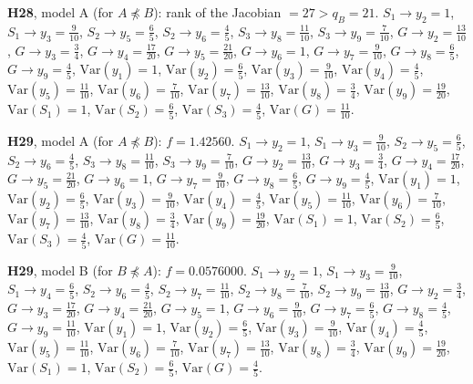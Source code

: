\documentclass[10pt,a4paper]{article}
\newcommand{\nnest}{\not\preceq}
\begin{document}
{\noindent\textbf{H28}, model A (for $A\nnest B$): rank of the Jacobian $=27>q_B=21$. {\footnotesize $S_{1}\to y_{2}=1$, $S_{1}\to y_{3}=\tfrac{9}{10}$, $S_{2}\to y_{5}=\tfrac{6}{5}$, $S_{2}\to y_{6}=\tfrac{4}{5}$, $S_{3}\to y_{8}=\tfrac{11}{10}$, $S_{3}\to y_{9}=\tfrac{7}{10}$, $G\to y_{2}=\tfrac{13}{10}$, $G\to y_{3}=\tfrac{3}{4}$, $G\to y_{4}=\tfrac{17}{20}$, $G\to y_{5}=\tfrac{21}{20}$, $G\to y_{6}=1$, $G\to y_{7}=\tfrac{9}{10}$, $G\to y_{8}=\tfrac{6}{5}$, $G\to y_{9}=\tfrac{4}{5}$, $\mathrm{Var}(y_{1})=1$, $\mathrm{Var}(y_{2})=\tfrac{6}{5}$, $\mathrm{Var}(y_{3})=\tfrac{9}{10}$, $\mathrm{Var}(y_{4})=\tfrac{4}{5}$, $\mathrm{Var}(y_{5})=\tfrac{11}{10}$, $\mathrm{Var}(y_{6})=\tfrac{7}{10}$, $\mathrm{Var}(y_{7})=\tfrac{13}{10}$, $\mathrm{Var}(y_{8})=\tfrac{3}{4}$, $\mathrm{Var}(y_{9})=\tfrac{19}{20}$, $\mathrm{Var}(S_{1})=1$, $\mathrm{Var}(S_{2})=\tfrac{6}{5}$, $\mathrm{Var}(S_{3})=\tfrac{4}{5}$, $\mathrm{Var}(G)=\tfrac{11}{10}$.}\par\smallskip
\noindent\textbf{H29}, model A (for $A\nnest B$): $f=1.42560$. {\footnotesize $S_{1}\to y_{2}=1$, $S_{1}\to y_{3}=\tfrac{9}{10}$, $S_{2}\to y_{5}=\tfrac{6}{5}$, $S_{2}\to y_{6}=\tfrac{4}{5}$, $S_{3}\to y_{8}=\tfrac{11}{10}$, $S_{3}\to y_{9}=\tfrac{7}{10}$, $G\to y_{2}=\tfrac{13}{10}$, $G\to y_{3}=\tfrac{3}{4}$, $G\to y_{4}=\tfrac{17}{20}$, $G\to y_{5}=\tfrac{21}{20}$, $G\to y_{6}=1$, $G\to y_{7}=\tfrac{9}{10}$, $G\to y_{8}=\tfrac{6}{5}$, $G\to y_{9}=\tfrac{4}{5}$, $\mathrm{Var}(y_{1})=1$, $\mathrm{Var}(y_{2})=\tfrac{6}{5}$, $\mathrm{Var}(y_{3})=\tfrac{9}{10}$, $\mathrm{Var}(y_{4})=\tfrac{4}{5}$, $\mathrm{Var}(y_{5})=\tfrac{11}{10}$, $\mathrm{Var}(y_{6})=\tfrac{7}{10}$, $\mathrm{Var}(y_{7})=\tfrac{13}{10}$, $\mathrm{Var}(y_{8})=\tfrac{3}{4}$, $\mathrm{Var}(y_{9})=\tfrac{19}{20}$, $\mathrm{Var}(S_{1})=1$, $\mathrm{Var}(S_{2})=\tfrac{6}{5}$, $\mathrm{Var}(S_{3})=\tfrac{4}{5}$, $\mathrm{Var}(G)=\tfrac{11}{10}$.}\par\smallskip
\noindent\textbf{H29}, model B (for $B\nnest A$): $f=0.0576000$. {\footnotesize $S_{1}\to y_{2}=1$, $S_{1}\to y_{3}=\tfrac{9}{10}$, $S_{1}\to y_{4}=\tfrac{6}{5}$, $S_{2}\to y_{6}=\tfrac{4}{5}$, $S_{2}\to y_{7}=\tfrac{11}{10}$, $S_{2}\to y_{8}=\tfrac{7}{10}$, $S_{2}\to y_{9}=\tfrac{13}{10}$, $G\to y_{2}=\tfrac{3}{4}$, $G\to y_{3}=\tfrac{17}{20}$, $G\to y_{4}=\tfrac{21}{20}$, $G\to y_{5}=1$, $G\to y_{6}=\tfrac{9}{10}$, $G\to y_{7}=\tfrac{6}{5}$, $G\to y_{8}=\tfrac{4}{5}$, $G\to y_{9}=\tfrac{11}{10}$, $\mathrm{Var}(y_{1})=1$, $\mathrm{Var}(y_{2})=\tfrac{6}{5}$, $\mathrm{Var}(y_{3})=\tfrac{9}{10}$, $\mathrm{Var}(y_{4})=\tfrac{4}{5}$, $\mathrm{Var}(y_{5})=\tfrac{11}{10}$, $\mathrm{Var}(y_{6})=\tfrac{7}{10}$, $\mathrm{Var}(y_{7})=\tfrac{13}{10}$, $\mathrm{Var}(y_{8})=\tfrac{3}{4}$, $\mathrm{Var}(y_{9})=\tfrac{19}{20}$, $\mathrm{Var}(S_{1})=1$, $\mathrm{Var}(S_{2})=\tfrac{6}{5}$, $\mathrm{Var}(G)=\tfrac{4}{5}$.}\par\smallskip
}
\end{document}
